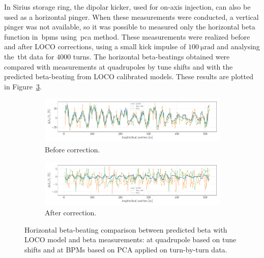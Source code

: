 In Sirius storage ring, the dipolar kicker, used for on-axis injection, can also be used as a horizontal pinger. When these measurements were conducted, a vertical pinger was not available, so it was possible to measured only the horizontal beta function in~\glspl{bpm} using~\gls{pca} method. These measurements were realized before and after LOCO corrections, using a small kick impulse of $\SI{100}{\micro\radian}$ and analysing the~\gls{tbt} data for 4000 turns. The horizontal beta-beatings obtained were compared with measurements at quadrupoles by tune shifts and with the predicted beta-beating from LOCO calibrated models. These results are plotted in Figure~\ref{fig:betax_compare}.
\begin{figure}
\centering
\begin{subfigure}[t]{1.0\textwidth}
\includegraphics[width=1.0\textwidth]{figures/betax_compare_loco_pca_quad_before_corr.pdf}
    \caption{Before correction.}
    \label{subfig:betax_compare_before}
\end{subfigure}
 \begin{subfigure}[t]{1.0\textwidth}
\includegraphics[width=1.0\textwidth]{figures/betax_compare_loco_pca_quad_after_corr.pdf}
    \caption{After correction.}
    \label{subfig:betax_compare_after}
\end{subfigure}
\caption{Horizontal beta-beating comparison between predicted beta with LOCO model and beta measurements: at quadrupole based on tune shifts and at BPMs based on PCA applied on turn-by-turn data.}
\label{fig:betax_compare}
\end{figure}

